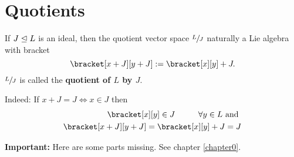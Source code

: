 \section{Quotients}
\begin{definition}
    If $J \trianglelefteq L$ is an ideal, then the quotient vector space $\sfrac{L}{J}$ 
    naturally a Lie algebra with bracket
    $$ \bracket[x + J][y + J] := \bracket[x][y] + J.$$
    $\sfrac{L}{J}$ is called the \textbf{quotient of $L$ by $J$}.
    
    Indeed: If $x + J = J \iff x \in J$ then
    \begin{align*}
        \bracket[x][y] \in J \tab \forall y \in L \text{ and }\\
        \bracket[x + J][y +J] = \bracket[x][y] + J = J
    \end{align*}
\end{definition}

\textbf{Important:} Here are some parts missing. See chapter \ref{chapter0}.
